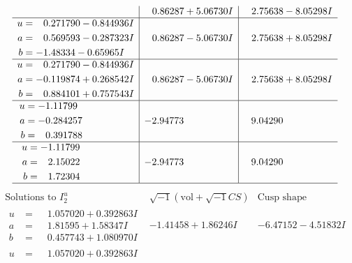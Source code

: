 \documentclass[1p]{elsarticle_modified}
\theoremstyle{definition}
\newcommand{\I}{\sqrt{-1}}
\begin{document}
$$\begin{array}{c|c|c}
 & \phantom{-}0.86287 + 5.06730 I & \phantom{-}2.75638 - 8.05298 I \\ \hline\begin{aligned}
u &= \phantom{-}0.271790 - 0.844936 I \\
a &= \phantom{-}0.569593 - 0.287323 I \\
b &= -1.48334 - 0.65965 I\end{aligned}
 & \phantom{-}0.86287 - 5.06730 I & \phantom{-}2.75638 + 8.05298 I \\ \hline\begin{aligned}
u &= \phantom{-}0.271790 - 0.844936 I \\
a &= -0.119874 + 0.268542 I \\
b &= \phantom{-}0.884101 + 0.757543 I\end{aligned}
 & \phantom{-}0.86287 - 5.06730 I & \phantom{-}2.75638 + 8.05298 I \\ \hline\begin{aligned}
u &= -1.11799\phantom{ +0.000000I} \\
a &= -0.284257\phantom{ +0.000000I} \\
b &= \phantom{-}0.391788\phantom{ +0.000000I}\end{aligned}
 & -2.94773\phantom{ +0.000000I} & \phantom{-}9.04290\phantom{ +0.000000I} \\ \hline\begin{aligned}
u &= -1.11799\phantom{ +0.000000I} \\
a &= \phantom{-}2.15022\phantom{ +0.000000I} \\
b &= \phantom{-}1.72304\phantom{ +0.000000I}\end{aligned}
 & -2.94773\phantom{ +0.000000I} & \phantom{-}9.04290\phantom{ +0.000000I}\\
 \hline 
 \end{array}$$\newpage$$\begin{array}{c|c|c}  
\text{Solutions to }I^u_{2}& \I (\text{vol} + \sqrt{-1}CS) & \text{Cusp shape}\\
 \hline 
\begin{aligned}
u &= \phantom{-}1.057020 + 0.392863 I \\
a &= \phantom{-}1.81595 + 1.58347 I \\
b &= \phantom{-}0.457743 + 1.080970 I\end{aligned}
 & -1.41458 + 1.86246 I & -6.47152 - 4.51832 I \\ \hline\begin{aligned}
u &= \phantom{-}1.057020 + 0.392863 I \\

\end{aligned}
\end{array}$$
\end{document}
